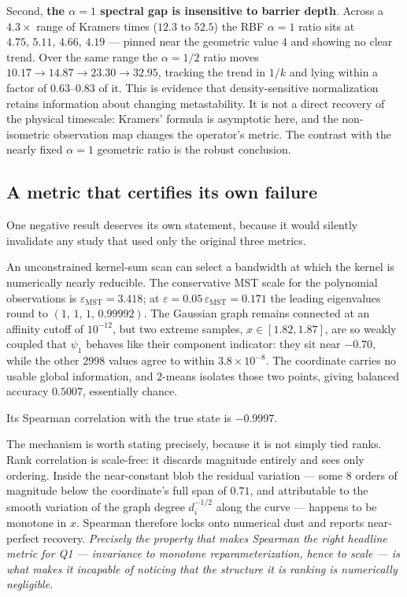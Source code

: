 \documentclass[11pt]{article}
\newcommand{\eps}{\varepsilon}
\begin{document}
Second, \textbf{the $\alpha=1$ spectral gap is insensitive to barrier depth}. Across a
$4.3\times$ range of Kramers times ($12.3$ to $52.5$) the RBF $\alpha=1$ ratio
sits at $4.75,\,5.11,\,4.66,\,4.19$ --- pinned near the geometric value $4$ and
showing no clear trend. Over the same range the $\alpha=1/2$ ratio moves
$10.17\to14.87\to23.30\to32.95$, tracking the trend in $1/k$ and lying within a
factor of $0.63$--$0.83$ of it. This is evidence that density-sensitive
normalization retains information about changing metastability. It is not a
direct recovery of the physical timescale: Kramers' formula is asymptotic here,
and the non-isometric observation map changes the operator's metric. The contrast
with the nearly fixed $\alpha=1$ geometric ratio is the robust conclusion.

\subsection{A metric that certifies its own failure}
\label{sec:degeneracy}

One negative result deserves its own statement, because it would silently
invalidate any study that used only the original three metrics.

An unconstrained kernel-sum scan can select a bandwidth at which the kernel is
numerically nearly reducible. The conservative MST scale for the polynomial
observations is $\eps_{\mathrm{MST}}=3.418$; at
$\eps=0.05\,\eps_{\mathrm{MST}}=0.171$ the leading eigenvalues round to
$(1,\,1,\,1,\,0.99992)$. The Gaussian graph remains connected at an affinity
cutoff of $10^{-12}$, but two extreme samples, $x\in[1.82,1.87]$, are so weakly
coupled that $\psi_1$ behaves like their component indicator: they sit near
$-0.70$, while the other $2998$ values agree to within $3.8\times10^{-8}$. The
coordinate carries no usable global information, and $2$-means isolates those two
points, giving balanced accuracy $0.5007$, essentially chance.

Its Spearman correlation with the true state is $\mathbf{-0.9997}$.

The mechanism is worth stating precisely, because it is not simply tied ranks.
Rank correlation is scale-free: it discards magnitude entirely and sees only
ordering. Inside the near-constant blob the residual variation --- some
$8$ orders of magnitude below the coordinate's full span of $0.71$, and
attributable to the smooth variation of the graph degree $d_i^{-1/2}$ along the
curve --- happens to be monotone in $x$. Spearman therefore locks onto numerical
dust and reports near-perfect recovery. \emph{Precisely the property that makes
Spearman the right headline metric for Q1 --- invariance to monotone
reparameterization, hence to scale --- is what makes it incapable of noticing
that the structure it is ranking is numerically negligible.}
\end{document}
